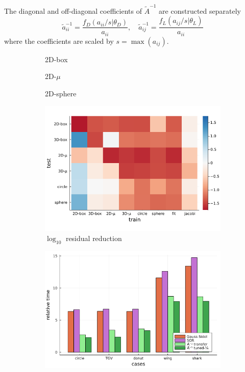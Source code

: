 \documentclass[review]{elsarticle}
\begin{document}
The diagonal and off-diagonal coefficients of $\tilde A^{-1}$ are constructed separately
\begin{equation}
    \tilde a^{-1}_{ii} = \frac{f_D(a_{ii}/s|\theta_D)}{a_{ii}} , \quad
    \tilde a^{-1}_{ij} = \frac{f_L(a_{ij}/s|\theta_L)}{a_{ii}}
\end{equation}
where the coefficients are scaled by $s=\max(a_{ij})$. 


\begin{figure}
    \centering
    \begin{subfigure}[b]{0.3\textwidth}
        \centering
        \caption{2D-box}
        \label{fig:2D-box}
    \end{subfigure}
    \begin{subfigure}[b]{0.3\textwidth}
        \centering
        \caption{2D-$\mu$}
        \label{fig:2D-mu}
    \end{subfigure}
    \begin{subfigure}[b]{0.3\textwidth}
        \centering
        \caption{2D-sphere}
        \label{fig:2D-sphere}
    \end{subfigure}
    \begin{subfigure}[b]{0.47\textwidth}
        \centering
        \includegraphics[width=\textwidth]{figures/crossloss.png}
        \caption{$\log_{10}$ residual reduction}
        \label{fig:cross plot}
    \end{subfigure}
    \hfill
    \begin{subfigure}[b]{0.47\textwidth}
        \centering
        \includegraphics[width=\textwidth]{figures/crosscount.png}

\end{subfigure}
\end{figure}
\end{document}
